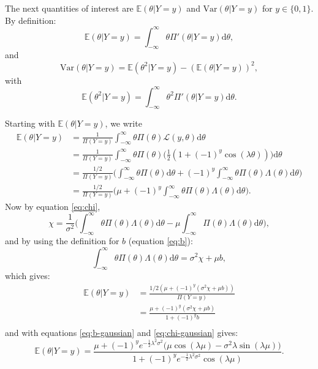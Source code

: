 \documentclass[]{report}
\begin{document}
The next quantities of interest are $\mathbb{E}(\theta | Y=y)$ and $\text{Var}(\theta|Y=y)$ for $y\in \{0,1\}$. By definition:
\begin{equation}
    \mathbb{E}(\theta | Y=y) = \int_{-\infty}^{\infty} \theta \Pi'(\theta|Y=y)\text{d}\theta,
\end{equation}
and
\begin{equation}
    \text{Var}(\theta|Y=y) = \mathbb{E}(\theta^2 | Y=y) - (\mathbb{E}(\theta | Y=y))^2,
\end{equation}
with
\begin{equation}
    \mathbb{E}(\theta^2 | Y=y) = \int_{-\infty}^{\infty} \theta^2 \Pi'(\theta|Y=y)\text{d}\theta.
\end{equation}

Starting with $\mathbb{E}(\theta | Y=y)$, we write
\begin{align}
    \mathbb{E}(\theta | Y=y) &= \frac{1}{\Pi(Y=y)} \int_{-\infty}^{\infty} \theta \Pi(\theta)\mathcal{L}(y, \theta)\text{d}\theta\\
    &= \frac{1}{\Pi(Y=y)} \int_{-\infty}^{\infty} \theta \Pi(\theta)\Big(\frac{1}{2}(1 + (-1)^{y} \cos(\lambda \theta))\Big)\text{d}\theta\\
    &= \frac{1/2}{\Pi(Y=y)} \Bigg(\int_{-\infty}^{\infty}\theta\Pi(\theta)\text{d}\theta + (-1)^y \int_{-\infty}^{\infty}\theta\Pi(\theta)\Lambda(\theta)\text{d}\theta\Bigg)\\
    &= \frac{1/2}{\Pi(Y=y)} \Bigg(\mu + (-1)^y \int_{-\infty}^{\infty}\theta\Pi(\theta)\Lambda(\theta)\text{d}\theta\Bigg).
\end{align}
Now by equation \eqref{eq:chi},
\begin{equation}
    \chi = \frac{1}{\sigma^2}\Bigg( \int_{-\infty}^{\infty} \theta\Pi(\theta)\Lambda(\theta)\text{d}\theta - \mu \int_{-\infty}^{\infty} \Pi(\theta)\Lambda(\theta)\text{d}\theta\Bigg),
\end{equation}
and by using the definition for $b$ (equation \eqref{eq:b}):
\begin{equation}
    \int_{-\infty}^{\infty} \theta\Pi(\theta)\Lambda(\theta)\text{d}\theta = \sigma^2\chi + \mu b,
\end{equation}
which gives:
\begin{align}
    \mathbb{E}(\theta | Y=y) &= \frac{1/2(\mu + (-1)^y(\sigma^2\chi + \mu b))}{\Pi(Y=y)}\\
    &= \frac{\mu + (-1)^y(\sigma^2\chi + \mu b)}{1+(-1)^yb}\\
\end{align}
and with equations \eqref{eq:b-gaussian} and \eqref{eq:chi-gaussian} gives:
\begin{equation}
    \mathbb{E}(\theta | Y=y) = \frac{\mu + (-1)^ye^{-\frac{1}{2}\lambda^2\sigma^2}\big(\mu\cos(\lambda\mu) - \sigma^2\lambda \sin(\lambda\mu)\big)}{1+(-1)^ye^{-\frac{1}{2}\lambda^2\sigma^2}\cos(\lambda\mu)}.
\end{equation}
\end{document}
